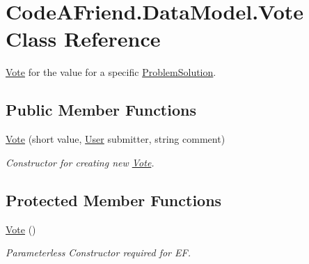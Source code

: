 \hypertarget{class_code_a_friend_1_1_data_model_1_1_vote}{}\section{Code\+A\+Friend.\+Data\+Model.\+Vote Class Reference}
\label{class_code_a_friend_1_1_data_model_1_1_vote}


\mbox{\hyperlink{class_code_a_friend_1_1_data_model_1_1_vote}{Vote}} for the value for a specific \mbox{\hyperlink{class_code_a_friend_1_1_data_model_1_1_problem_solution}{Problem\+Solution}}.  


\subsection*{Public Member Functions}
\begin{DoxyCompactItemize}
\item 
\mbox{\hyperlink{class_code_a_friend_1_1_data_model_1_1_vote_ac4cd3a11d8dfa4ea9051393dc9a5fa72}{Vote}} (short value, \mbox{\hyperlink{class_code_a_friend_1_1_data_model_1_1_user}{User}} submitter, string comment)
\begin{DoxyCompactList}\small\item\em Constructor for creating new \mbox{\hyperlink{class_code_a_friend_1_1_data_model_1_1_vote}{Vote}}.\end{DoxyCompactList}\end{DoxyCompactItemize}
\subsection*{Protected Member Functions}
\begin{DoxyCompactItemize}
\item 
\mbox{\hyperlink{class_code_a_friend_1_1_data_model_1_1_vote_af8e9b81421b774c013cc5a35cd7d463b}{Vote}} ()
\begin{DoxyCompactList}\small\item\em Parameterless Constructor required for EF.\end{DoxyCompactList}\end{DoxyCompactItemize}
